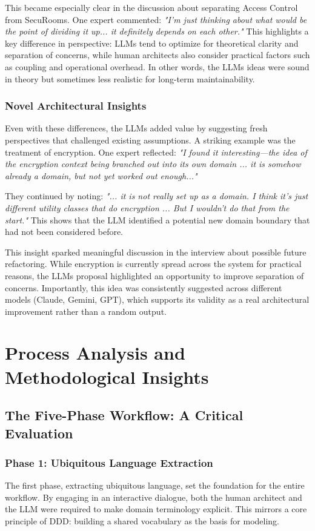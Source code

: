 This became especially clear in the discussion about separating Access Control from SecuRooms. One expert commented: \textit{"I'm just thinking about what would be the point of dividing it up... it definitely depends on each other."} This highlights a key difference in perspective: LLMs tend to optimize for theoretical clarity and separation of concerns, while human architects also consider practical factors such as coupling and operational overhead. In other words, the LLMs ideas were sound in theory but sometimes less realistic for long-term maintainability.

\subsubsection{Novel Architectural Insights}
Even with these differences, the LLMs added value by suggesting fresh perspectives that challenged existing assumptions. A striking example was the treatment of encryption. One expert reflected: \textit{"I found it interesting—the idea of the encryption context being branched out into its own domain ... it is somehow already a domain, but not yet worked out enough..."} 

They continued by noting: \textit{"... it is not really set up as a domain. I think it's just different utility classes that do encryption ... But I wouldn't do that from the start."} This shows that the LLM identified a potential new domain boundary that had not been considered before. 

This insight sparked meaningful discussion in the interview about possible future refactoring. While encryption is currently spread across the system for practical reasons, the LLMs proposal highlighted an opportunity to improve separation of concerns. Importantly, this idea was consistently suggested across different models (Claude, Gemini, GPT), which supports its validity as a real architectural improvement rather than a random output.

\section{Process Analysis and Methodological Insights}

\subsection{The Five-Phase Workflow: A Critical Evaluation}

\subsubsection{Phase 1: Ubiquitous Language Extraction}
The first phase, extracting ubiquitous language, set the foundation for the entire workflow. By engaging in an interactive dialogue, both the human architect and the LLM were required to make domain terminology explicit. This mirrors a core principle of DDD: building a shared vocabulary as the basis for modeling.  

